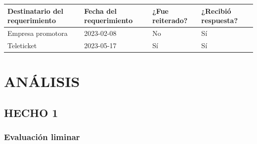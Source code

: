 \documentclass[
  11pt,
  a4paper,
  oneside]{article}
\begin{document}
\begin{table} 
      \setlength\extrarowheight{5pt} 
      \begin{tabular}{| M{3.5cm} | M{3.5cm} | M{3.5cm} | M{3.5cm}|} 
      \hline 
      \textbf{Destinatario del requerimiento} & \textbf{Fecha del requerimiento} & \textbf{¿Fue reiterado?} & \textbf{¿Recibió respuesta?} \\ [10pt] 
      \hline\hline
Empresa promotora & 2023-02-08 & No & Sí\\ [10pt]
\hline
Teleticket & 2023-05-17 & Sí & Sí\\ [10pt]

      \hline\end{tabular} 
      \end{table}

\section{ANÁLISIS}\label{anuxe1lisis}

\subsection{HECHO  1 }\subsubsection{Evaluación liminar}
\end{document}
